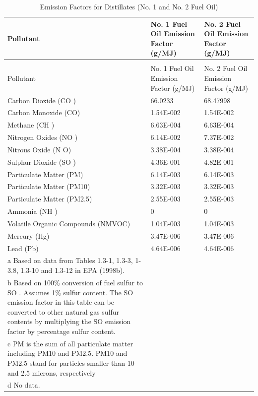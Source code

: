 \begin{longtable}[c]{p{3.0in}p{1.5in}p{1.5in}}
\caption{Emission Factors for Distillates (No. 1 and No. 2 Fuel Oil) \label{table:emission-factors-for-distillates-no.-1}} \tabularnewline
\toprule 
Pollutant & No. 1 Fuel Oil Emission Factor   (g/MJ) & No. 2 Fuel Oil Emission Factor   (g/MJ) \tabularnewline
\midrule
\endfirsthead

\caption[]{Emission Factors for Distillates (No. 1 and No. 2 Fuel Oil)} \tabularnewline
\toprule 
Pollutant & No. 1 Fuel Oil Emission Factor   (g/MJ) & No. 2 Fuel Oil Emission Factor   (g/MJ) \tabularnewline
\midrule
\endhead

Carbon Dioxide (CO  ) & 66.0233 & 68.47998 \tabularnewline
Carbon Monoxide (CO) & 1.54E-002 & 1.54E-002 \tabularnewline
Methane (CH  ) & 6.63E-004 & 6.63E-004 \tabularnewline
Nitrogen Oxides (NO  ) & 6.14E-002 & 7.37E-002 \tabularnewline
Nitrous Oxide (N  O) & 3.38E-004 & 3.38E-004 \tabularnewline
Sulphur Dioxide (SO  ) & 4.36E-001 & 4.82E-001 \tabularnewline
Particulate Matter (PM) & 6.14E-003 & 6.14E-003 \tabularnewline
Particulate Matter (PM10) & 3.32E-003 & 3.32E-003 \tabularnewline
Particulate Matter (PM2.5) & 2.55E-003 & 2.55E-003 \tabularnewline
Ammonia (NH  ) & 0 & 0 \tabularnewline
Volatile Organic Compounds (NMVOC) & 1.04E-003 & 1.04E-003 \tabularnewline
Mercury (Hg) & 3.47E-006 & 3.47E-006 \tabularnewline
Lead (Pb) & 4.64E-006 & 4.64E-006 \tabularnewline
a Based on data from Tables 1.3-1, 1.3-3, 1-3.8, 1.3-10 and 1.3-12 in EPA (1998b). &  &  \tabularnewline
b Based on 100\% conversion of fuel sulfur to SO  . Assumes 1\% sulfur content. The SO   emission factor in this table can be converted to other natural gas sulfur contents by multiplying the SO   emission factor by percentage sulfur content. &  &  \tabularnewline
c PM is the sum of all particulate matter including PM10 and PM2.5. PM10 and PM2.5 stand for particles smaller than 10 and 2.5 microns, respectively &  &  \tabularnewline
d No data. &  &  \tabularnewline
\bottomrule
\end{longtable}

